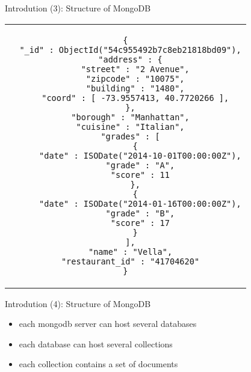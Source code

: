 \begin{frame}[fragile]{Introdution (3): Structure of MongoDB}
  \begin{tabular}{c}
    \begin{lstlisting}
{
  "_id" : ObjectId("54c955492b7c8eb21818bd09"),
  "address" : {
    "street" : "2 Avenue",
    "zipcode" : "10075",
    "building" : "1480",
    "coord" : [ -73.9557413, 40.7720266 ],
  },
  "borough" : "Manhattan",
  "cuisine" : "Italian",
  "grades" : [
    {
      "date" : ISODate("2014-10-01T00:00:00Z"),
      "grade" : "A",
      "score" : 11
    },
    {
      "date" : ISODate("2014-01-16T00:00:00Z"),
      "grade" : "B",
      "score" : 17
    }
  ],
  "name" : "Vella",
  "restaurant_id" : "41704620"
}
    \end{lstlisting}
  \end{tabular}
\end{frame}

\begin{frame}[fragile]{Introdution (4): Structure of MongoDB}
  \centering
  \begin{itemize}
    \item each mongodb server can host several databases
    \item each database can host several collections
    \item each collection contains a set of documents
  \end{itemize}
\end{frame}
